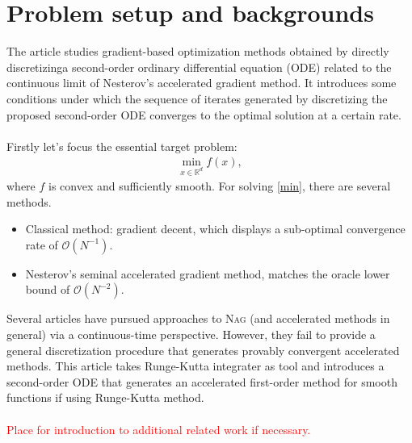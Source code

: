 

\section{Problem setup and backgrounds}

The article studies gradient-based optimization methods obtained by directly
discretizinga second-order ordinary differential equation (ODE) related to the
continuous limit of Nesterov's accelerated gradient method. It introduces some
conditions under which the sequence of iterates generated by discretizing the
proposed second-order ODE converges to the optimal solution at a certain rate.\\\\
Firstly let's focus the essential target problem:
\begin{align}\label{min}
  \mathop{\mathrm{min}}\limits_{x \in \mathbb{R}^{d}} f(x),
\end{align}
where $f$ is convex and sufficiently smooth. For solving \ref{min}, there are several
methods.
\begin{itemize}
  \item Classical method: gradient decent, which displays a sub-optimal convergence rate of $\mathcal{O}(N^{-1})$.
  \item Nesterov's seminal accelerated gradient method, matches the oracle lower bound of $\mathcal{O}(N^{-2})$.
\end{itemize}
Several articles have pursued approaches to \textsc{Nag} (and accelerated methods in general)
via a continuous-time perspective. However, they fail to provide a general
discretization procedure that generates provably convergent accelerated methods.
This article takes Runge-Kutta integrater as tool and introduces a second-order ODE
that generates an accelerated first-order method for smooth functions if using
Runge-Kutta method.\\\\
\textcolor{red}{Place for introduction to additional related work if necessary.}

